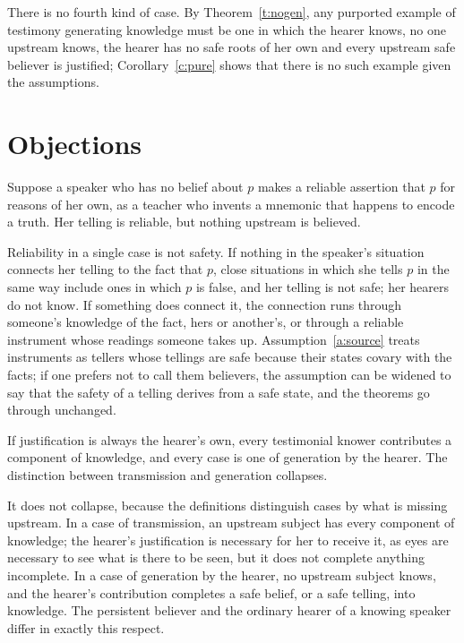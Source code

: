 \documentclass{situationist-preprint}
\begin{document}
There is no fourth kind of case. By Theorem~\ref{t:nogen}, any purported example of testimony generating knowledge must be one in which the hearer knows, no one upstream knows, the hearer has no safe roots of her own and every upstream safe believer is justified; Corollary~\ref{c:pure} shows that there is no such example given the assumptions.

\section{Objections}

\begin{objection}
Suppose a speaker who has no belief about $p$ makes a reliable assertion that $p$ for reasons of her own, as a teacher who invents a mnemonic that happens to encode a truth. Her telling is reliable, but nothing upstream is believed.
\end{objection}

\begin{reply}
Reliability in a single case is not safety. If nothing in the speaker's situation connects her telling to the fact that $p$, close situations in which she tells $p$ in the same way include ones in which $p$ is false, and her telling is not safe; her hearers do not know. If something does connect it, the connection runs through someone's knowledge of the fact, hers or another's, or through a reliable instrument whose readings someone takes up. Assumption~\ref{a:source} treats instruments as tellers whose tellings are safe because their states covary with the facts; if one prefers not to call them believers, the assumption can be widened to say that the safety of a telling derives from a safe state, and the theorems go through unchanged.
\end{reply}

\begin{objection}
If justification is always the hearer's own, every testimonial knower contributes a component of knowledge, and every case is one of generation by the hearer. The distinction between transmission and generation collapses.
\end{objection}

\begin{reply}
It does not collapse, because the definitions distinguish cases by what is missing upstream. In a case of transmission, an upstream subject has every component of knowledge; the hearer's justification is necessary for her to receive it, as eyes are necessary to see what is there to be seen, but it does not complete anything incomplete. In a case of generation by the hearer, no upstream subject knows, and the hearer's contribution completes a safe belief, or a safe telling, into knowledge. The persistent believer and the ordinary hearer of a knowing speaker differ in exactly this respect.
\end{reply}
\end{document}
